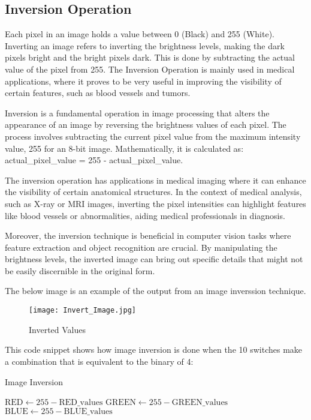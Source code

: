 \subsection{Inversion Operation}
\par Each pixel in an image holds a value between 0 (Black) and 255 (White). Inverting an image refers to inverting the brightness levels, making the dark pixels bright and the bright pixels dark. This is done by subtracting the actual value of the pixel from 255. The Inversion Operation is mainly used in medical applications, where it proves to be very useful in improving the visibility of certain features, such as blood vessels and tumors. \newline
\par Inversion is a fundamental operation in image processing that alters the appearance of an image by reversing the brightness values of each pixel. The process involves subtracting the current pixel value from the maximum intensity value, 255 for an 8-bit image. Mathematically, it is calculated as: actual\_pixel\_value = 255 - actual\_pixel\_value. \newline
\par The inversion operation has applications in medical imaging where it can enhance the visibility of certain anatomical structures. In the context of medical analysis, such as X-ray or MRI images, inverting the pixel intensities can highlight features like blood vessels or abnormalities, aiding medical professionals in diagnosis. \newline
\par Moreover, the inversion technique is beneficial in computer vision tasks where feature extraction and object recognition are crucial. By manipulating the brightness levels, the inverted image can bring out specific details that might not be easily discernible in the original form. \newline
\par The below image is an example of the output from an image inverssion technique. \newline
\begin{figure}[H]
    \centering
    \texttt{[image: Invert\_Image.jpg]}
    \caption{Inverted Values}
    \label{fig:imageInverted}  
\end{figure}
\par This code snippet shows how image inversion is done when the 10 switches make a combination that is equivalent to the binary of 4: \newline
\begin{algorithm}[H]
	\caption{Image Inversion \cite{fpgaipvgarepo}}
	\begin{algorithmic}[1]
		\State {}
		\State $\text{RED} \gets 255 - \text{RED\_values}$
		\State $\text{GREEN} \gets 255 - \text{GREEN\_values}$
		\State $\text{BLUE} \gets 255 - \text{BLUE\_values}$
		\EndIf
	\end{algorithmic}
\end{algorithm}

